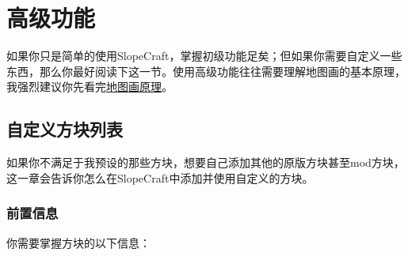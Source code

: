 \documentclass[UTF8]{ctexart}
\begin{document}
   \pagebreak
   \section{高级功能}
   如果你只是简单的使用SlopeCraft，掌握初级功能足矣；但如果你需要自定义一些东西，那么你最好阅读下这一节。使用高级功能往往需要理解地图画的基本原理，我强烈建议你先看完\href{https://github.com/ToKiNoBug/SlopeCraftTutorial/blob/main/BasicPrinciple/Principle%20of%20map%20pixel%20arts.md}{地图画原理}。

   \subsection{自定义方块列表}
   如果你不满足于我预设的那些方块，想要自己添加其他的原版方块甚至mod方块，这一章会告诉你怎么在SlopeCraft中添加并使用自定义的方块。
   
   \subsubsection{前置信息}
   你需要掌握方块的以下信息：
\end{document}
